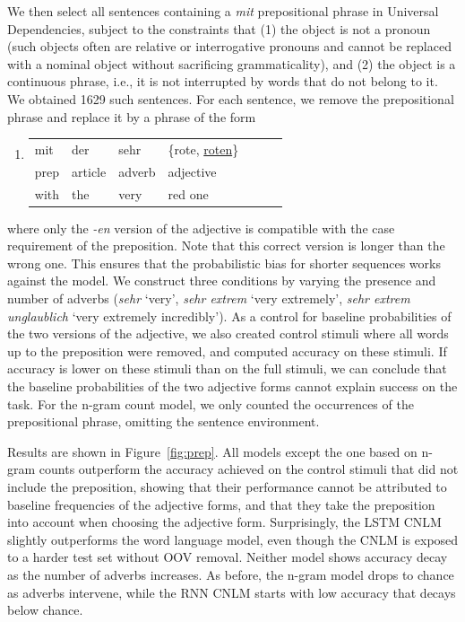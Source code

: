 We then select all sentences containing a \emph{mit} prepositional phrase in Universal Dependencies, subject to the constraints that (1) the object is not a pronoun (such objects often are relative or interrogative pronouns and cannot be replaced with a nominal object without sacrificing grammaticality), and (2) the object is a continuous phrase, i.e., it is not interrupted by words that do not belong to it. %
We obtained 1629 such sentences.
For each sentence, we remove the prepositional phrase and replace it by a phrase of the form
\begin{enumerate}[label={(\arabic*)}]
	\item \begin{tabular}[t]{lllllll}
	mit & der & sehr& \{rote, \underline{roten}\} \\
	prep & article  & adverb & adjective \\
	with & the & very  & red one 
\end{tabular}
\end{enumerate}
where only the \emph{-en} version of the adjective is compatible with
the case requirement of the preposition. Note that this correct
version is longer than the wrong one. This ensures that the
probabilistic bias for shorter sequences works against the model.  We
construct three conditions by varying the presence and number of
adverbs (\emph{sehr} `very', \emph{sehr extrem} `very extremely',
\emph{sehr extrem unglaublich} `very extremely incredibly').  As a
control for baseline probabilities of the two versions of the
adjective, we also created control stimuli where all words up to the
preposition were removed, and computed accuracy on these stimuli.  If
accuracy is lower on these stimuli than on the full stimuli, we can
conclude that the baseline probabilities of the two adjective forms
cannot explain success on the task. For the n-gram count model, we
only counted the occurrences of the prepositional phrase, omitting the
sentence environment.

%
%
Results are shown in Figure~\ref{fig:prep}. All models except the one
based on n-gram counts outperform the accuracy achieved on the control
stimuli that did not include the preposition, showing that their
performance cannot be attributed to baseline frequencies of the
adjective forms, and that they take the preposition into account when
choosing the adjective form.  Surprisingly, the LSTM CNLM slightly
outperforms the word language model, even though the CNLM is exposed
to a harder test set without OOV removal.  Neither model shows
accuracy decay as the number of adverbs increases.  As before, the
n-gram model drops to chance as adverbs intervene, while the RNN CNLM
starts with low accuracy that decays below chance.

